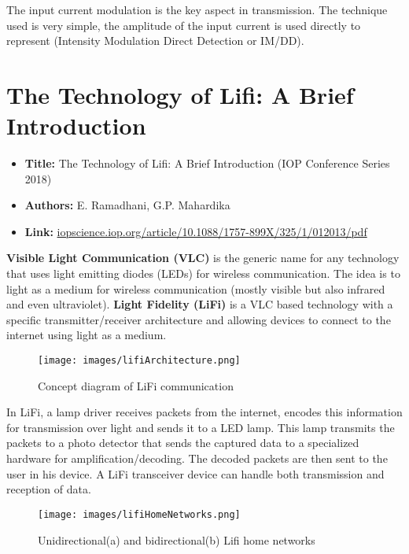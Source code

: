 \documentclass[a4paper,12pt,twoside]{article}
\begin{document}
	The input current modulation is the key aspect in transmission. The technique used is very simple, the amplitude of the input current is used directly to represent  (Intensity Modulation Direct Detection or IM/DD).
	
	\section{The Technology of Lifi: A Brief Introduction}
	\begin{tcolorbox}
		\begin{itemize}
			\item \textbf{Title:} The Technology of Lifi: A Brief Introduction (IOP Conference Series 2018)
			\item \textbf{Authors:} E. Ramadhani, G.P. Mahardika
			\item \textbf{Link:} \href{https://iopscience.iop.org/article/10.1088/1757-899X/325/1/012013/pdf}{iopscience.iop.org/article/10.1088/1757-899X/325/1/012013/pdf}
		\end{itemize}
	\end{tcolorbox}
	
	\textbf{Visible Light Communication (VLC)} is the generic name for any technology that uses light emitting diodes (LEDs) for wireless communication. The idea is to light as a medium for wireless communication (mostly visible but also infrared and even ultraviolet). \textbf{Light Fidelity (LiFi)} is a VLC based technology with a specific transmitter/receiver architecture and allowing devices to connect to the internet using light as a medium.
	
	 \begin{figure}[h]
	 	\centering
	 	\texttt{[image: images/lifiArchitecture.png]}
	 	\caption{Concept diagram of LiFi communication}
	 \end{figure}
	
	In LiFi, a lamp driver receives packets from the internet, encodes this information for transmission over light and sends it to a LED lamp. This lamp transmits the packets to a photo detector that sends the captured data to a specialized hardware for amplification/decoding. The decoded packets are then sent to the user in his device. A LiFi transceiver device can handle both transmission and reception of data.
	
	\begin{figure}[h]
		\centering
		\texttt{[image: images/lifiHomeNetworks.png]}
		\caption{Unidirectional(a) and bidirectional(b) Lifi home networks}
	\end{figure}
	
\end{document}
